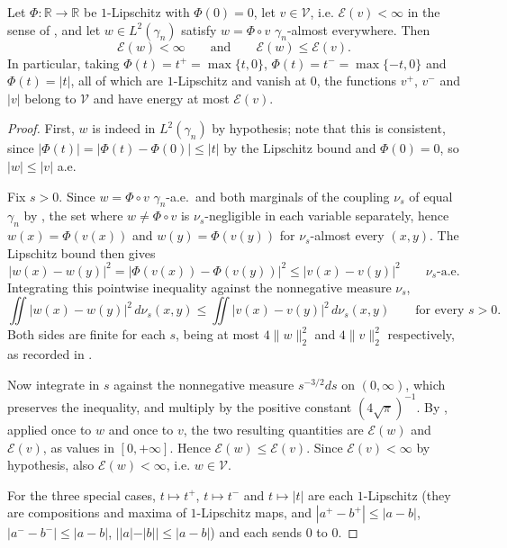 \begin{lemma}
Let $\Phi : \mathbb{R} \to \mathbb{R}$ be $1$-Lipschitz with $\Phi(0) = 0$, let
$v \in \mathcal{V}$, i.e. $\mathcal{E}(v) < \infty$ in the sense of
, and let $w \in L^2(\gamma_n)$ satisfy $w = \Phi \circ v$
$\gamma_n$-almost everywhere.  Then
\[
  \mathcal{E}(w) < \infty
  \qquad\text{and}\qquad
  \mathcal{E}(w) \leq \mathcal{E}(v) .
\]
In particular, taking $\Phi(t) = t^+ = \max\{t,0\}$, $\Phi(t) = t^- = \max\{-t,0\}$
and $\Phi(t) = |t|$, all of which are $1$-Lipschitz and vanish at $0$, the
functions $v^+$, $v^-$ and $|v|$ belong to $\mathcal{V}$ and have energy at most
$\mathcal{E}(v)$.
\end{lemma}
\begin{proof}
First, $w$ is indeed in $L^2(\gamma_n)$ by hypothesis; note that this is
consistent, since $|\Phi(t)| = |\Phi(t)-\Phi(0)| \leq |t|$ by the Lipschitz bound
and $\Phi(0)=0$, so $|w| \leq |v|$ a.e.

Fix $s > 0$.  Since $w = \Phi\circ v$ $\gamma_n$-a.e.\ and both marginals of the
coupling $\nu_s$ of  equal $\gamma_n$ by
, the set where $w \neq \Phi\circ v$ is
$\nu_s$-negligible in each variable separately, hence
$w(x) = \Phi(v(x))$ and $w(y) = \Phi(v(y))$ for $\nu_s$-almost every $(x,y)$.
The Lipschitz bound then gives
\[
  |w(x) - w(y)|^2 = |\Phi(v(x)) - \Phi(v(y))|^2 \leq |v(x) - v(y)|^2
  \qquad \nu_s\text{-a.e.}
\]
Integrating this pointwise inequality against the nonnegative measure $\nu_s$,
\[
  \iint |w(x)-w(y)|^2 \, d\nu_s(x,y)
    \leq \iint |v(x)-v(y)|^2 \, d\nu_s(x,y)
  \qquad\text{for every } s > 0 .
\]
Both sides are finite for each $s$, being at most $4\|w\|_2^2$ and
$4\|v\|_2^2$ respectively, as recorded in .

Now integrate in $s$ against the nonnegative measure $s^{-3/2}ds$ on
$(0,\infty)$, which preserves the inequality, and multiply by the positive
constant $(4\sqrt\pi)^{-1}$.  By , applied once to $w$
and once to $v$, the two resulting quantities are $\mathcal{E}(w)$ and
$\mathcal{E}(v)$, as values in $[0,+\infty]$.  Hence
$\mathcal{E}(w) \leq \mathcal{E}(v)$.  Since $\mathcal{E}(v) < \infty$ by
hypothesis, also $\mathcal{E}(w) < \infty$, i.e. $w \in \mathcal{V}$.

For the three special cases, $t \mapsto t^+$, $t\mapsto t^-$ and $t \mapsto |t|$
are each $1$-Lipschitz (they are compositions and maxima of $1$-Lipschitz maps,
and $|a^+-b^+| \leq |a-b|$, $|a^--b^-|\leq|a-b|$, $||a|-|b||\leq|a-b|$) and each
sends $0$ to $0$.
\end{proof}
